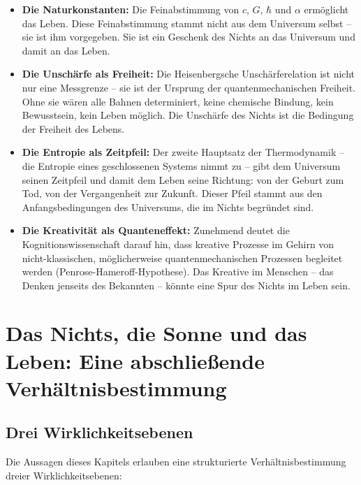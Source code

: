 ﻿\documentclass[12pt,a4paper]{report}
\begin{document}
\begin{itemize}
	\item \textbf{Die Naturkonstanten:} Die Feinabstimmung von $c$, $G$, $\hbar$ und $\alpha$ ermöglicht das Leben. Diese Feinabstimmung stammt nicht aus dem Universum selbst -- sie ist ihm vorgegeben. Sie ist ein Geschenk des Nichts an das Universum und damit an das Leben.

	\item \textbf{Die Unschärfe als Freiheit:} Die Heisenbergsche Unschärferelation ist nicht nur eine Messgrenze -- sie ist der Ursprung der quantenmechanischen Freiheit. Ohne sie wären alle Bahnen determiniert, keine chemische Bindung, kein Bewusstsein, kein Leben möglich. Die Unschärfe des Nichts ist die Bedingung der Freiheit des Lebens.

	\item \textbf{Die Entropie als Zeitpfeil:} Der zweite Hauptsatz der Thermodynamik -- die Entropie eines geschlossenen Systems nimmt zu -- gibt dem Universum seinen Zeitpfeil und damit dem Leben seine Richtung: von der Geburt zum Tod, von der Vergangenheit zur Zukunft. Dieser Pfeil stammt aus den Anfangsbedingungen des Universums, die im Nichts begründet sind.

	\item \textbf{Die Kreativität als Quanteneffekt:} Zunehmend deutet die Kognitionswis\-senschaft darauf hin, dass kreative Prozesse im Gehirn von nicht-klassischen, möglicherweise quantenmechanischen Prozessen begleitet werden (Penrose-Hameroff-Hypothese). Das Kreative im Menschen -- das Denken jenseits des Bekannten -- könnte eine Spur des Nichts im Leben sein.
\end{itemize}

\section{Das Nichts, die Sonne und das Leben: Eine abschließende Verhältnisbestimmung}

\subsection{Drei Wirklichkeitsebenen}

Die Aussagen dieses Kapitels erlauben eine strukturierte Verhältnisbestimmung dreier Wirklichkeitsebenen:
\end{document}
